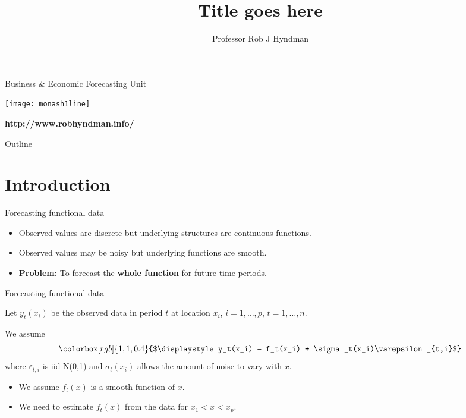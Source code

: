 \documentclass[14pt]{beamer}
\title{Title goes here}
\author{Professor Rob J Hyndman}
\date{}
\makeatletter
\def\biz{\begin{itemize}[<+-| alert@+>]}
\def\eiz{\end{itemize}}
\makeatother
\begin{document}
\begin{frame}
\titlepage

\centerline{Business \& Economic Forecasting Unit}

\centerline{\texttt{[image: monash1line]}}

\centerline{\small\color[rgb]{0.01,0.33,0.58}
\textbf{http://www.robhyndman.info/}}

\end{frame}

\monashlogo

\begin{frame}{Outline}

\tableofcontents
\end{frame}

\section{Introduction}

\begin{frame}{Forecasting functional data}

\biz
\item Observed values are discrete but underlying structures are
continuous functions.

\item Observed values may be noisy but underlying functions are
smooth.

\item {\bf Problem:} To forecast the \textbf{whole function} for
future time periods.
\eiz

\end{frame}


\begin{frame}{Forecasting functional data}


Let $y_t(x_i)$ be the observed data in period $t$ at location $x_i$,
$i=1,\dots,p$, $t=1,\dots,n$.

\pause

We assume
$$\colorbox[rgb]{1,1,0.4}{$\displaystyle y_t(x_i) =
f_t(x_i) + \sigma_t(x_i)\varepsilon_{t,i}$}
$$
where $\varepsilon_{t,i}$ is iid N(0,1) and $\sigma_t(x_i)$ allows
the amount of noise to vary with $x$.

\pause

\biz
\item We assume $f_t(x)$ is a smooth function of $x$.

\item We need to estimate $f_t(x)$ from the data for $x_1 < x <
x_p$.
\eiz
\end{frame}
\end{document}
